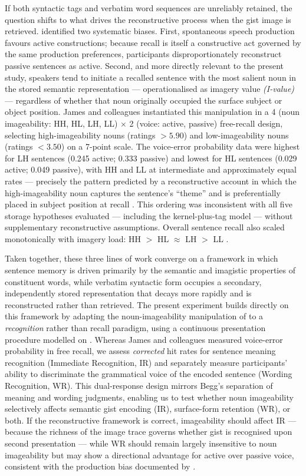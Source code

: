 \documentclass[12pt, a4paper]{article}
\begin{document}
If both syntactic tags and verbatim word sequences are unreliably retained, the
question shifts to what drives the reconstructive process when the gist image is
retrieved. \citet{james1973} identified two systematic biases. First, spontaneous
speech production favours active constructions; because recall is itself a
constructive act governed by the same production preferences, participants
disproportionately reconstruct passive sentences as active. Second, and more
directly relevant to the present study, speakers tend to initiate a recalled
sentence with the most salient noun in the stored semantic representation —
operationalised as imagery value \textit{(I-value)} — regardless of whether that
noun originally occupied the surface subject or object position. James and
colleagues instantiated this manipulation in a 4 (noun imageability: HH, HL,
LH, LL) $\times$ 2 (voice: active, passive) free-recall design, selecting
high-imageability nouns (ratings $> 5.90$) and low-imageability nouns
(ratings $< 3.50$) on a 7-point scale. The voice-error probability data
\citep[Table~2]{james1973} were highest for LH sentences (0.245 active;
0.333 passive) and lowest for HL sentences (0.029 active; 0.049 passive),
with HH and LL at intermediate and approximately equal rates — precisely the
pattern predicted by a reconstructive account in which the high-imageability
noun captures the sentence's ``theme'' and is preferentially placed in subject
position at recall \citep{james1973}. This ordering was inconsistent with all
five storage hypotheses evaluated — including the kernel-plus-tag model — without
supplementary reconstructive assumptions. Overall sentence recall also scaled
monotonically with imagery load: HH $>$ HL $\approx$ LH $>$ LL
\citep[Table~1]{james1973}.

Taken together, these three lines of work converge on a framework in which
sentence memory is driven primarily by the semantic and imagistic properties of
constituent words, while verbatim syntactic form occupies a secondary,
independently stored representation that decays more rapidly and is
reconstructed rather than retrieved. The present experiment builds directly on
this framework by adapting the noun-imageability manipulation of
\citet{james1973} to a \textit{recognition} rather than recall paradigm, using
a continuous presentation procedure modelled on \citet{begg1971}. Whereas James
and colleagues measured voice-error probability in free recall, we assess
\textit{corrected} hit rates for sentence meaning recognition (Immediate
Recognition, IR) and separately measure participants' ability to discriminate
the grammatical voice of the encoded sentence (Wording Recognition, WR). This
dual-response design mirrors Begg's separation of meaning and wording judgments,
enabling us to test whether noun imageability selectively affects semantic gist
encoding (IR), surface-form retention (WR), or both. If the reconstructive
framework is correct, imageability should affect IR — because the richness of the
image trace governs whether gist is recognised upon second presentation — while
WR should remain largely insensitive to noun imageability but may show a
directional advantage for active over passive voice, consistent with the
production bias documented by \citet{james1973}.
\end{document}
